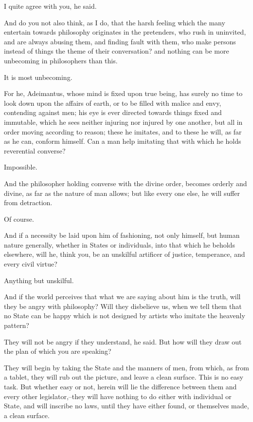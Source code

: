 I quite agree with you, he said.

And do you not also think, as I do, that the harsh feeling which the
many entertain towards philosophy originates in the pretenders, who rush
in uninvited, and are always abusing them, and finding fault with them,
who make persons instead of things the theme of their conversation? and
nothing can be more unbecoming in philosophers than this.

It is most unbecoming.

For he, Adeimantus, whose mind is fixed upon true being, has surely no
time to look down upon the affairs of earth, or to be filled with malice
and envy, contending against men; his eye is ever directed towards
things fixed and immutable, which he sees neither injuring nor injured
by one another, but all in order moving according to reason; these he
imitates, and to these he will, as far as he can, conform himself. Can a
man help imitating that with which he holds reverential converse?

Impossible.

And the philosopher holding converse with the divine order, becomes
orderly and divine, as far as the nature of man allows; but like every
one else, he will suffer from detraction.

Of course.

And if a necessity be laid upon him of fashioning, not only himself,
but human nature generally, whether in States or individuals, into
that which he beholds elsewhere, will he, think you, be an unskilful
artificer of justice, temperance, and every civil virtue?

Anything but unskilful.

And if the world perceives that what we are saying about him is the
truth, will they be angry with philosophy? Will they disbelieve us, when
we tell them that no State can be happy which is not designed by artists
who imitate the heavenly pattern?

They will not be angry if they understand, he said. But how will they
draw out the plan of which you are speaking?

They will begin by taking the State and the manners of men, from which,
as from a tablet, they will rub out the picture, and leave a clean
surface. This is no easy task. But whether easy or not, herein will lie
the difference between them and every other legislator,--they will have
nothing to do either with individual or State, and will inscribe no
laws, until they have either found, or themselves made, a clean surface.

